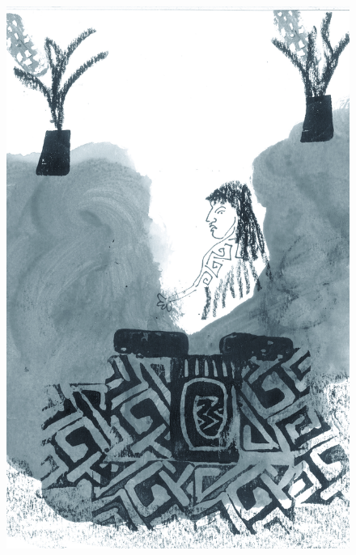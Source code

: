 \vspace*{\fill}

\pagebreak
\thispagestyle{empty}
\begin{figure}
\vspace*{-1.6cm}
\hspace*{-2.2cm}\includegraphics[width=138mm]{./imgs/img8.jpg}
\end{figure}

\chapter*{}

\mbox{}\vspace*{\fill}

